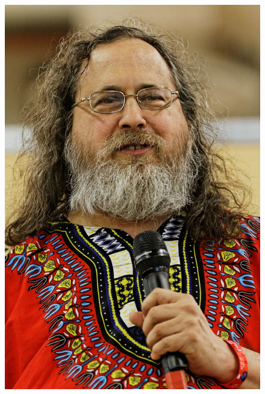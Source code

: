 \documentclass[12pt]{article}
\begin{document}
\begin{multicols}{3}
  \begin{figure}
  \includegraphics[width=\linewidth]{Images/Stallman.jpeg}
  \end{figure}

  \vfill


\end{multicols}
\end{document}

